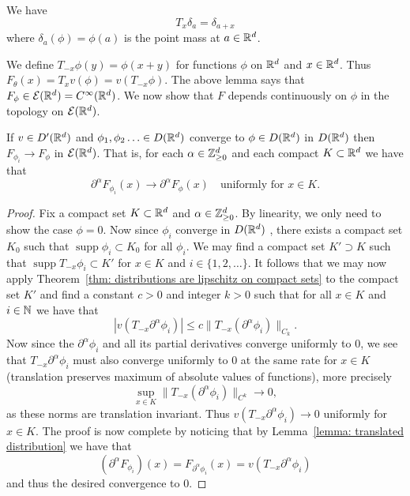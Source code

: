 \documentclass[twoside, a4paper, 10pt]{amsart}
\begin{document}
\begin{eg} We have $$T_x \delta_a = \delta_{a+x}$$ where $\delta_a(\phi) = \phi(a)$ is the point mass at $a \in \mathbb{R}^d$.

\end{eg}

We define $T_{-x}\phi(y) = \phi(x+y)$ for functions $\phi$ on $\mathbb{R}^d$ and $x \in \mathbb{R}^d$. Thus $F_{\theta}(x) = T_x v(\phi) = v(T_{-x}\phi)$. The above lemma says that $F_{\phi} \in \mathcal{E}(\mathbb{R}^d) = C^{\infty}(\mathbb{R}^d)$. We now show that $F$ depends continuously on $\phi$ in the topology on $\mathcal{E}(\mathbb{R}^d)$.

\begin{lemma}\label{lemma: T_x v continuous} If $v \in D'(\mathbb{R}^d)$ and $\phi_1, \phi_2 \ldots \in D(\mathbb{R}^d)$ converge to $\phi \in D(\mathbb{R}^d)$ in $D(\mathbb{R}^d)$ then $F_{\phi_i} \to F_{\phi}$ in $\mathcal{E}(\mathbb{R}^d)$. That is, for each $\alpha \in \mathbb{Z}_{\geq 0}^d$ and each compact $K \subset \mathbb{R}^d$ we have that $$\partial^{\alpha}F_{\phi_i}(x) \to \partial^{\alpha}F_{\phi}(x) \quad \text{uniformly for } x \in K.$$

\end{lemma}

\begin{proof} Fix a compact set $K \subset \mathbb{R}^d$ and $\alpha \in \mathbb{Z}_{\geq 0}^d$. By linearity, we only need to show the case $\phi=0$. Now since $\phi_i$ converge in $D(\mathbb{R}^d)$ , there exists a compact set $K_0$ such that $\operatorname{supp} \phi_i \subset K_0$ for all $\phi_i$. We may find a compact set $K' \supset K$ such that $\operatorname{supp} T_{-x} \phi_i \subset K'$ for $x \in K$ and $i \in \{1,2,\ldots \}$. 
It follows that we may now apply Theorem~\ref{thm: distributions are lipschitz on compact sets} to the compact set $K'$ and find a constant $c>0$ and integer $k>0$ such that for all $x \in K$ and $i \in \mathbb{N}$ we have that $$|v(T_{-x}\partial^{\alpha}\phi_i)| \leq c \| T_{-x}(\partial^{\alpha}\phi_i) \|_{C_k}.$$ 
Now since the $\partial^{\alpha}\phi_i$ and all its partial derivatives converge uniformly to $0$, we see that $T_{-x}\partial^{\alpha}\phi_i$ must also converge uniformly to $0$ at the same rate for $x \in K$ (translation preserves maximum of absolute values of functions), more precisely $$\sup_{x \in K} \|T_{-x}(\partial^{\alpha}\phi_i)  \|_{C^k} \to 0,$$ as these norms are translation invariant. Thus $v(T_{-x}\partial^{\alpha}\phi_i) \to 0$ uniformly for $x \in K$. The proof is now complete by noticing that by Lemma~\ref{lemma: translated distribution} we have that $$(\partial^{\alpha}F_{\phi_i})(x) = F_{\partial^{\alpha}\phi_i}(x) = v(T_{-x}\partial^{\alpha}\phi_i)$$ and thus the desired convergence to $0$.  \end{proof}
\end{document}
